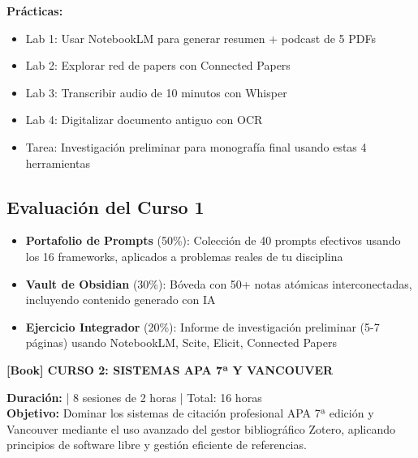 \documentclass[12pt,a4paper]{yaac-luatex}
\newcommand{\faBookOpen}{[Book]}
\newcommand{\cursotitulo}[2]{
	\vspace{0.5cm}
	\begin{tcolorbox}[
		enhanced,
		colback=#1,
		colframe=#1,
		arc=5pt,
		boxrule=0pt,
		left=12pt,
		right=12pt,
		top=10pt,
		bottom=10pt
		]
		{\color{white}\Large\bfseries #2}
	\end{tcolorbox}
}
\begin{document}
\begin{tcolorbox}[
		enhanced,
		colback=white,
		colframe=curso1color,
		arc=3pt,
		boxrule=1.5pt,
		left=10pt,
		right=10pt,
		top=8pt,
		bottom=8pt,
		breakable
		]
		\textbf{Prácticas:}
		\begin{itemize}[leftmargin=*, itemsep=0.1cm]
			\item Lab 1: Usar NotebookLM para generar resumen + podcast de 5 PDFs
			\item Lab 2: Explorar red de papers con Connected Papers
			\item Lab 3: Transcribir audio de 10 minutos con Whisper
			\item Lab 4: Digitalizar documento antiguo con OCR
			\item Tarea: Investigación preliminar para monografía final usando estas 4 herramientas
		\end{itemize}
	\end{tcolorbox}
	
	\vspace{0.5cm}
	
	\subsection*{Evaluación del Curso 1}
	
	\begin{itemize}[leftmargin=*, itemsep=0.2cm]
		\item \textbf{Portafolio de Prompts} (50\%): Colección de 40 prompts efectivos usando los 16 frameworks, aplicados a problemas reales de tu disciplina
		\item \textbf{Vault de Obsidian} (30\%): Bóveda con 50+ notas atómicas interconectadas, incluyendo contenido generado con IA
		\item \textbf{Ejercicio Integrador} (20\%): Informe de investigación preliminar (5-7 páginas) usando NotebookLM, Scite, Elicit, Connected Papers
	\end{itemize}
	
	\newpage
	
	
	\cursotitulo{curso2color}{\faBookOpen \hspace{0.5em} CURSO 2: SISTEMAS APA 7ª Y VANCOUVER}
	
	\vspace{0.3cm}
	
	\begin{tcolorbox}[
		enhanced,
		colback=white,
		colframe=curso2color,
		arc=3pt,
		boxrule=2pt,
		breakable
		]
		\textbf{Duración:}  | 8 sesiones de 2 horas | Total: 16 horas\\[0.2cm]
		\textbf{Objetivo:} Dominar los sistemas de citación profesional APA 7ª edición y Vancouver mediante el uso avanzado del gestor bibliográfico Zotero, aplicando principios de software libre y gestión eficiente de referencias.
	\end{tcolorbox}
	
\end{document}
